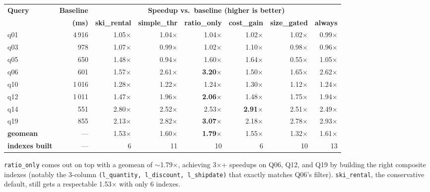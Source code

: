 \documentclass[10pt,a4paper]{article}
\newcommand{\code}[1]{\texttt{\small #1}}
\begin{document}
\begin{table}[h]
\centering\small
\begin{tabular}{lrrrrrrr}
\toprule
\textbf{Query} & \textbf{Baseline} & \multicolumn{6}{c}{\textbf{Speedup vs.\ baseline (higher is better)}} \\
\cmidrule(lr){3-8}
                &  \textbf{(ms)} & \textbf{ski\_rental} & \textbf{simple\_thr} & \textbf{ratio\_only} & \textbf{cost\_gain} & \textbf{size\_gated} & \textbf{always} \\
\midrule
q01   & 4\,916  & 1.05$\times$ & 1.04$\times$ & 1.04$\times$ & 1.02$\times$ & 1.02$\times$ & 0.99$\times$ \\
q03   &   978   & 1.07$\times$ & 0.99$\times$ & 1.02$\times$ & 1.10$\times$ & 0.98$\times$ & 0.96$\times$ \\
q05   &   650   & 1.48$\times$ & 0.94$\times$ & 1.60$\times$ & 1.64$\times$ & 0.55$\times$ & 1.05$\times$ \\
q06   &   601   & 1.57$\times$ & 2.61$\times$ & \textbf{3.20$\times$} & 1.50$\times$ & 1.65$\times$ & 2.62$\times$ \\
q10   & 1\,016  & 1.28$\times$ & 1.22$\times$ & 1.24$\times$ & 1.30$\times$ & 1.12$\times$ & 1.24$\times$ \\
q12   & 1\,011  & 1.47$\times$ & 1.96$\times$ & \textbf{2.06$\times$} & 1.48$\times$ & 1.75$\times$ & 1.94$\times$ \\
q14   &   551   & 2.80$\times$ & 2.52$\times$ & 2.53$\times$ & \textbf{2.91$\times$} & 2.51$\times$ & 2.49$\times$ \\
q19   &   855   & 2.13$\times$ & 2.82$\times$ & \textbf{3.07$\times$} & 2.18$\times$ & 2.78$\times$ & 2.93$\times$ \\
\midrule
\textbf{geomean}       & --- & 1.53$\times$ & 1.60$\times$ & \textbf{1.79$\times$} & 1.55$\times$ & 1.32$\times$ & 1.61$\times$ \\
\textbf{indexes built} & --- & 6 & 11 & 10 & 6 & 10 & 13 \\
\bottomrule
\end{tabular}
\end{table}

\noindent\code{ratio\_only} comes out on top with a geomean of
$\sim$1.79$\times$, achieving 3$\times$+ speedups on Q06, Q12, and
Q19 by building the right composite indexes (notably the 3-column
\code{(l\_quantity, l\_discount, l\_shipdate)} that exactly matches
Q06's filter). \code{ski\_rental}, the conservative default, still
gets a respectable 1.53$\times$ with only 6 indexes.
\end{document}
